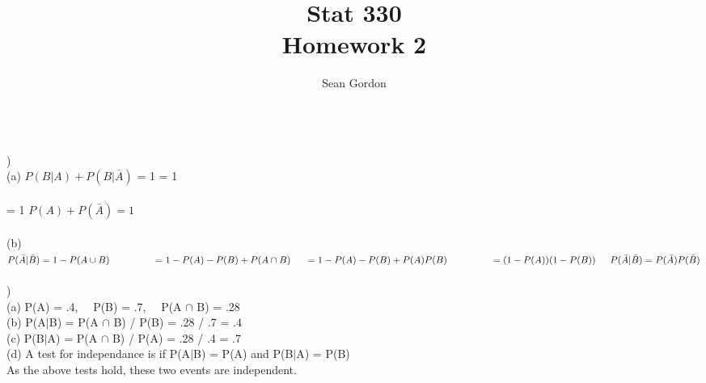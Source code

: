 \documentclass[12pt]{article}
\title{Stat 330\\Homework 2}
\author{Sean Gordon}
\begin{document}
\maketitle


\noindent\hrulefill \\


)\\
\indent (a) $P(B|A) + P(B|\bar{A})$ = 1
\indent \indent {} = 1\\\\
\indent {} = 1
\indent \indent \indent  $P(A) + P(\bar{A}) = 1$ \checkmark\\

\indent \indent  \hrulefill \indent \indent \indent \\

\indent (b) $P(\bar{A}|\bar{B}) = 1 - P(A \cup B)
\indent \indent \indent = 1 - P(A) - P(B) + P(A \cap B)\\\\
\indent = 1 - P(A) - P(B) + P(A)P(B)
\indent \indent \indent = (1 - P(A))(1 - P(B))\\\\
\indent  P(\bar{A}|\bar{B}) = P(\bar{A})P(\bar{B})$ \checkmark\\


\noindent \hrulefill \\


)\\
\indent (a) P(A) = .4, \ \ P(B) = .7, \ \ P(A $\cap$ B) = .28\\
\indent (b) P(A$|$B) = P(A $\cap$ B) / P(B) = .28 / .7 = .4\\
\indent (c) P(B$|$A) = P(A $\cap$ B) / P(A) = .28 / .4 = .7\\
\indent (d) A test for independance is if P(A$|$B) = P(A) and P(B$|$A) = P(B)\\
\indent \indent As the above tests hold, these two events are independent.\\


\noindent \hrulefill \\
\pagebreak
\end{document}
